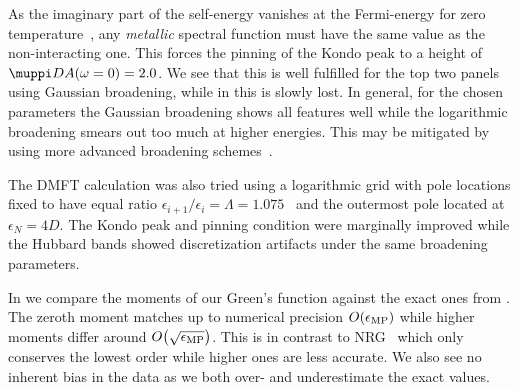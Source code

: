As the imaginary part of the self-energy vanishes at the Fermi-energy
for zero temperature~\cite{Hewson1993},
any \emph{metallic} spectral function must have the same value as the non-interacting one.
This forces the pinning of the Kondo peak to a height of $\muppi D A(\omega=0) = 2.0$.
We see that this is well fulfilled for the top two panels using Gaussian broadening,
while in  this is slowly lost.
In general, for the chosen parameters the Gaussian broadening shows all features
well while the logarithmic broadening smears out too much at higher energies.
This may be mitigated by using more advanced broadening schemes~\cite{Lee2016}.

The DMFT calculation was also tried using a logarithmic grid
with pole locations fixed to have equal ratio
$\epsilon_{i+1}/\epsilon_i = \Lambda=1.075$~\cite{Bulla2008} and
the outermost pole located at $\epsilon_N = 4D$.
The Kondo peak and pinning condition were marginally improved while
the Hubbard bands showed discretization artifacts under the same broadening parameters.

In  we compare the moments of our Green's function
against the exact ones from .
The zeroth moment matches up to numerical precision $O\!\left(\epsilon_\mathrm{MP}\right)$
while higher moments differ around $O\!\left(\sqrt{\epsilon_\mathrm{MP}}\right)$.
This is in contrast to NRG~\cite{Bulla2008,Kugler2022} which only conserves the lowest order
while higher ones are less accurate.
We also see no inherent bias in the data as we both over- and underestimate the exact values.
\begin{table}[ht]
    \caption{
        Difference $\Delta G^{(n)}$ of the $n$-th moment of the impurity Green's function $G$
        to the exact value.
    }%
    \label{tab:spectrum-moments}
    \centering
\end{table}

